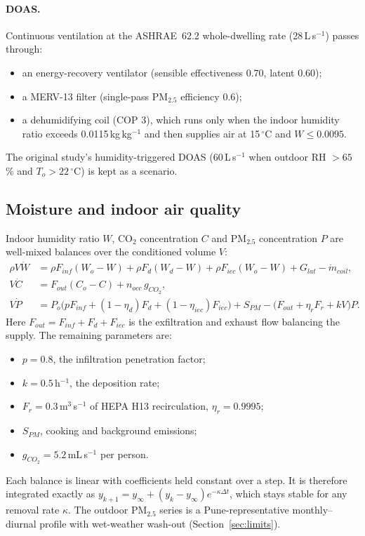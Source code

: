 \paragraph{DOAS.}
Continuous ventilation at the ASHRAE~62.2 whole-dwelling rate (28\,L\,s$^{-1}$) passes
through:
\begin{itemize}
  \item an energy-recovery ventilator (sensible effectiveness 0.70, latent 0.60);
  \item a MERV-13 filter (single-pass PM$_{2.5}$ efficiency 0.6);
  \item a dehumidifying coil (COP 3), which runs only when the indoor humidity ratio
        exceeds 0.0115\,kg\,kg$^{-1}$ and then supplies air at 15\,$^\circ$C and
        $W\le0.0095$.
\end{itemize}
The original study's humidity-triggered DOAS (60\,L\,s$^{-1}$ when outdoor RH $>65$\,\%
and $T_o>22\,^\circ$C) is kept as a scenario.

\subsection{Moisture and indoor air quality}
Indoor humidity ratio $W$, CO$_2$ concentration $C$ and PM$_{2.5}$ concentration $P$ are
well-mixed balances over the conditioned volume $V$:
\begin{align}
\rho V\dot W &= \rho F_{inf}(W_o-W)+\rho F_{d}(W_{d}-W)+\rho F_{iec}(W_o-W)+G_{lat}-\dot m_{coil},\\
V\dot C &= F_{out}(C_o-C)+n_{occ}\,g_{CO_2},\\
V\dot P &= P_o\big(p F_{inf}+(1-\eta_d)F_d+(1-\eta_{iec})F_{iec}\big) + S_{PM}
  -\big(F_{out}+\eta_r F_r + kV\big)P.
\end{align}
Here $F_{out}=F_{inf}+F_d+F_{iec}$ is the exfiltration and exhaust flow balancing the
supply. The remaining parameters are:
\begin{itemize}
  \item $p=0.8$, the infiltration penetration factor;
  \item $k=0.5$\,h$^{-1}$, the deposition rate;
  \item $F_r=0.3$\,m$^3$\,s$^{-1}$ of HEPA H13 recirculation, $\eta_r=0.9995$;
  \item $S_{PM}$, cooking and background emissions;
  \item $g_{CO_2}=5.2$\,mL\,s$^{-1}$ per person.
\end{itemize}
Each balance is linear with coefficients held constant over a step. It is therefore
integrated exactly as $y_{k+1}=y_\infty+(y_k-y_\infty)e^{-\kappa\Delta t}$, which stays
stable for any removal rate $\kappa$. The outdoor PM$_{2.5}$ series is a
Pune-representative monthly--diurnal profile with wet-weather wash-out (Section~\ref{sec:limits}).

